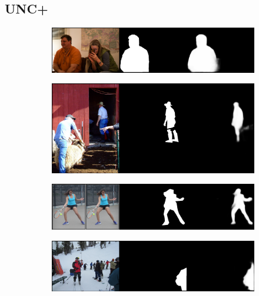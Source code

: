 \subsection*{UNC+}
\begin{figure}[!htbp]
	\centering
    \begin{subfigure}[b]{\columnwidth}
            \centering
            \includegraphics[width=\textwidth]{./figures/unc_plus_samples/1.png}
    \end{subfigure}
    \begin{subfigure}[b]{\columnwidth}
            \centering
            \includegraphics[width=\textwidth]{./figures/unc_plus_samples/2.png}
    \end{subfigure}
    
    \begin{subfigure}[b]{\columnwidth}
            \centering
            \includegraphics[width=\textwidth]{./figures/unc_plus_samples/3.png}
    \end{subfigure}
    
    \begin{subfigure}[b]{\columnwidth}
            \centering
            \includegraphics[width=\textwidth]{./figures/unc_plus_samples/4.png}
    \end{subfigure}
    

\end{figure}
